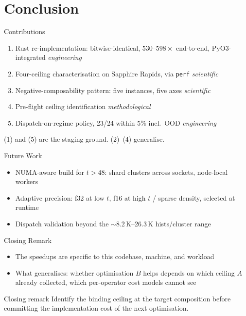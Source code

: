 \documentclass[aspectratio=169,10pt]{beamer}
\begin{document}
\section{Conclusion}

\begin{frame}{Contributions}
  \begin{enumerate}
    \item Rust re-implementation: bitwise-identical, $530$--$598\times$ end-to-end, PyO3-integrated \hfill \emph{engineering}
    \item Four-ceiling characterisation on Sapphire Rapids, via \texttt{perf} \hfill \emph{scientific}
    \item Negative-composability pattern: five instances, five axes \hfill \emph{scientific}
    \item Pre-flight ceiling identification \hfill \emph{methodological}
    \item Dispatch-on-regime policy, 23/24 within 5\% incl.\ OOD \hfill \emph{engineering}
  \end{enumerate}
  \vfill
  (1) and (5) are the staging ground. (2)--(4) generalise.
\end{frame}

\begin{frame}{Future Work}
  \begin{itemize}
    \item NUMA-aware build for $t > 48$: shard clusters across sockets, node-local workers
    \item Adaptive precision: f32 at low $t$, f16 at high $t$ / sparse density, selected at runtime
    \item Dispatch validation beyond the $\sim$8.2\,K--26.3\,K hists/cluster range
  \end{itemize}
\end{frame}

\begin{frame}{Closing Remark}
  \begin{itemize}
    \item The speedups are specific to this codebase, machine, and workload
    \item What generalises: whether optimisation $B$ helps depends on which ceiling $A$ already collected, which per-operator cost models cannot see
  \end{itemize}
  \vfill
  \begin{alertblock}{Closing remark}
    Identify the binding ceiling at the target composition before committing the implementation cost of the next optimisation.
  \end{alertblock}
\end{frame}
\end{document}
